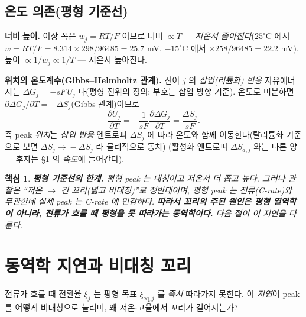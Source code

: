 \documentclass[11pt,a4paper]{article}
\newtheorem*{keybox}{핵심}
\newcommand{\eq}{\mathrm{eq}}
\begin{document}
\subsection{온도 의존(평형 기준선)}
\textbf{너비$\cdot$높이.} 이상 폭은 $w_j=RT/F$ 이므로 너비 $\propto T$ — \emph{저온서 좁아진다}($25^\circ$C 에서
$w=RT/F=8.314\times298/96485=25.7$ mV, $-15^\circ$C 에서 $\times258/96485=22.2$ mV). 높이 $\propto1/w_j\propto
1/T$ — 저온서 높아진다.

\textbf{위치의 온도계수(Gibbs--Helmholtz 관계).} 전이 $j$ 의 \emph{삽입(리튬화) 반응} 자유에너지는 $\Delta G_j=-sF\,U_j$
다(평형 전위의 정의; 부호는 삽입 방향 기준). 온도로 미분하면 $\partial\Delta G_j/\partial T=-\Delta S_j$(Gibbs 관계)이므로
\begin{equation}
\frac{\partial U_j}{\partial T}=-\frac{1}{sF}\frac{\partial\Delta G_j}{\partial T}=\frac{\Delta S_j}{sF}.
\label{eq:dUdT}
\end{equation}
즉 peak \emph{위치}는 \emph{삽입 반응} 엔트로피 $\Delta S_j$ 에 따라 온도와 함께 이동한다(탈리튬화 기준으로 보면
$\Delta S_j\!\to\!-\Delta S_j$ 라 물리적으로 동치) \cite{reynier2004}(활성화 엔트로피 $\Delta S_{a,j}$ 와는 다른 양 —
후자는 \S\ref{sec:lag} 의 \emph{속도}에 들어간다).

\begin{keybox}
\textbf{평형 기준선의 한계.} 평형 peak 는 \emph{대칭}이고 저온서 \emph{더 좁고 높다}. 그러나 관찰은
``저온 $\to$ \emph{긴 꼬리}(넓고 비대칭)''로 \emph{정반대}이며, 평형 peak 는 전류(C-rate)와 무관한데 실제 peak
는 C-rate 에 민감하다. \textbf{따라서 꼬리의 주된 원인은 평형 열역학이 아니라, 전류가 흐를 때 평형을 못 따라가는
동역학이다.} 다음 절이 이 지연을 다룬다.
\end{keybox}

\section{동역학 지연과 비대칭 꼬리}\label{sec:lag}
전류가 흐를 때 전환율 $\xi_j$ 는 평형 목표 $\xi_{\eq,j}$ 를 \emph{즉시} 따라가지 못한다. 이
\emph{지연}이 peak 를 어떻게 비대칭으로 늘리며, 왜 저온$\cdot$고율에서 꼬리가 길어지는가?
\end{document}
